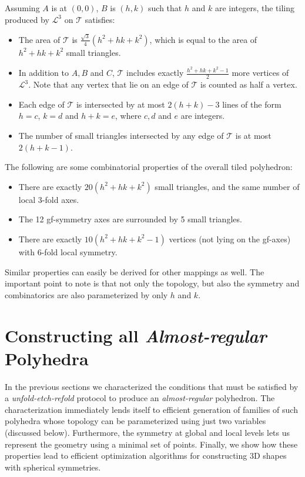 \documentclass[11pt]{article}
\newcommand{\1}{\mathds{1}}
\begin{document}
Assuming $A$ is at $(0,0)$, $B$ is $(h,k)$ such that $h$ and $k$ are integers, the tiling produced by $\mathcal{L}^3$ on $\mathcal{T}$ satisfies:
   \begin{itemize}
      \item The area of $\mathcal{T}$ is $\frac{\sqrt{3}}{4} (h^2+hk+k^2)$, which is equal to the area of $h^2+hk+k^2$ small triangles.
      \item In addition to $A, B$ and $C$, $\mathcal{T}$ includes exactly $\frac{h^2+hk+k^2-1}{2}$ more vertices of $\mathcal{L}^3$. Note that any vertex that lie on an edge of $\mathcal{T}$ is counted as half a vertex.
      \item Each edge of $\mathcal{T}$ is intersected by at most $2(h + k) - 3$ lines of the form $h=c$, $k=d$ and $h+k=e$, where $c,d$ and $e$ are integers.
      \item The number of small triangles intersected by any edge of $\mathcal{T}$ is at most $2(h+k-1)$.
   \end{itemize}

The following are some combinatorial properties of the overall tiled polyhedron:
   \begin{itemize}
      \item There are exactly $20(h^2+hk+k^2)$ small triangles, and the same number of local 3-fold axes.
      \item The 12 gf-symmetry axes are surrounded by 5 small triangles.
      \item There are exactly $10(h^2+hk+k^2-1)$ vertices (not lying on the gf-axes) with 6-fold local symmetry.
   \end{itemize}

Similar properties can easily be derived for other mappings as well. The important point to note is that not only the topology, but also the symmetry and combinatorics are also parameterized by only $h$ and $k$.

\section{Constructing all \emph{Almost-regular} Polyhedra}
In the previous sections we characterized the conditions that must be satisfied by a \emph{unfold-etch-refold} protocol to produce an \emph{almost-regular} polyhedron. The characterization immediately lends itself to efficient generation of families of such polyhedra whose topology can be parameterized using just two variables (discussed below). Furthermore, the symmetry at global and local levels lets us represent the geometry using a minimal set of points. Finally, we show how these properties lead to efficient optimization algorithms for constructing 3D shapes with spherical symmetries.
\end{document}
